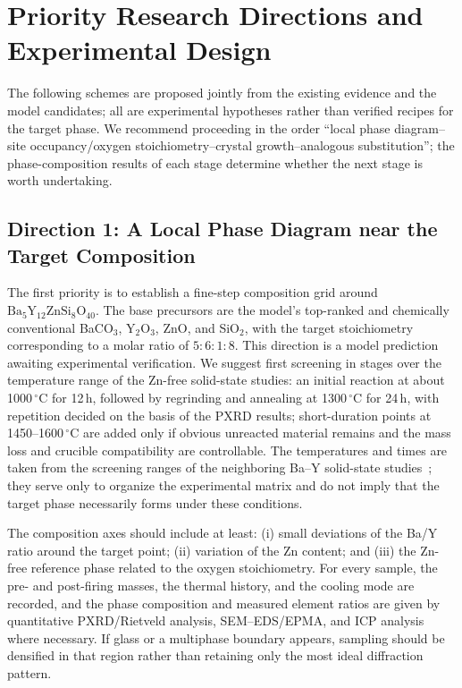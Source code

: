 \section{Priority Research Directions and Experimental Design}
\label{sec:future-directions}

The following schemes are proposed jointly from the existing evidence and the model candidates; all are experimental hypotheses rather than verified recipes for the target phase. We recommend proceeding in the order ``local phase diagram--site occupancy/oxygen stoichiometry--crystal growth--analogous substitution''; the phase-composition results of each stage determine whether the next stage is worth undertaking.

\subsection{Direction 1: A Local Phase Diagram near the Target Composition}

The first priority is to establish a fine-step composition grid around $\mathrm{Ba_5Y_{12}ZnSi_8O_{40}}$. The base precursors are the model's top-ranked and chemically conventional BaCO$_3$, Y$_2$O$_3$, ZnO, and SiO$_2$, with the target stoichiometry corresponding to a molar ratio of $5{:}6{:}1{:}8$. This direction is a model prediction awaiting experimental verification. We suggest first screening in stages over the temperature range of the Zn-free solid-state studies: an initial reaction at about 1000\,$^\circ$C for 12\,h, followed by regrinding and annealing at 1300\,$^\circ$C for 24\,h, with repetition decided on the basis of the PXRD results; short-duration points at 1450--1600\,$^\circ$C are added only if obvious unreacted material remains and the mass loss and crucible compatibility are controllable. The temperatures and times are taken from the screening ranges of the neighboring Ba--Y solid-state studies~\cite{yamane2024microstructure,gulay2024navigation}; they serve only to organize the experimental matrix and do not imply that the target phase necessarily forms under these conditions.

The composition axes should include at least: (i) small deviations of the Ba\slash Y ratio around the target point; (ii) variation of the Zn content; and (iii) the Zn-free reference phase related to the oxygen stoichiometry. For every sample, the pre- and post-firing masses, the thermal history, and the cooling mode are recorded, and the phase composition and measured element ratios are given by quantitative PXRD\slash Rietveld analysis, SEM--EDS\slash EPMA, and ICP analysis where necessary. If glass or a multiphase boundary appears, sampling should be densified in that region rather than retaining only the most ideal diffraction pattern.

